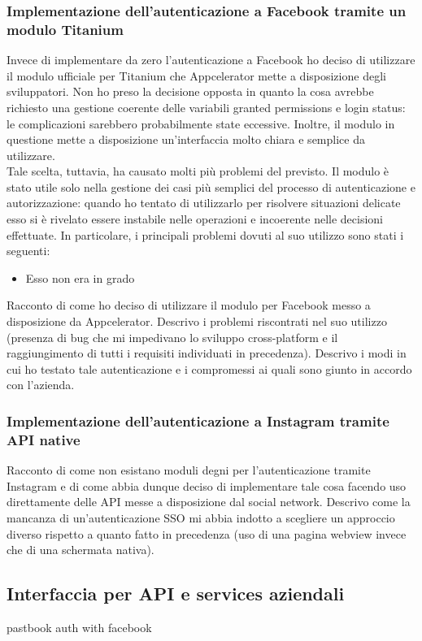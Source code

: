 			\subsubsection{Implementazione dell'autenticazione a Facebook tramite un modulo Titanium}
				Invece di implementare da zero l'autenticazione a Facebook ho deciso di utilizzare il modulo ufficiale per Titanium
				che Appcelerator mette a disposizione degli sviluppatori. Non ho preso la decisione opposta in quanto la cosa
				avrebbe richiesto una gestione coerente delle variabili granted permissions e login status: le complicazioni
				sarebbero probabilmente state eccessive. Inoltre, il modulo in questione mette a disposizione un'interfaccia
				molto chiara e semplice da utilizzare.\\
				Tale scelta, tuttavia, ha causato molti più problemi del previsto. Il modulo è stato utile solo nella gestione dei
				casi più semplici del processo di autenticazione e autorizzazione: quando ho tentato di utilizzarlo per risolvere
				situazioni delicate esso si è rivelato essere instabile nelle operazioni e incoerente nelle decisioni effettuate. In
				particolare, i principali problemi dovuti al suo utilizzo sono stati i seguenti:
				\begin{itemize}
					\item Esso non era in grado
				\end{itemize}
				Racconto di come ho deciso di utilizzare il modulo per Facebook messo a disposizione da Appcelerator. Descrivo i
				problemi riscontrati nel suo utilizzo (presenza di bug che mi impedivano lo sviluppo cross-platform e il
				raggiungimento di tutti i requisiti individuati in precedenza). Descrivo i modi in cui ho testato tale autenticazione
				e i compromessi ai quali sono giunto in accordo con l'azienda.
			\subsubsection{Implementazione dell'autenticazione a Instagram tramite API native}
				Racconto di come non esistano moduli degni per l'autenticazione tramite Instagram e di come abbia dunque deciso di
				implementare tale cosa facendo uso direttamente delle API messe a disposizione dal social network. Descrivo come la
				mancanza di un'autenticazione SSO mi abbia indotto a scegliere un approccio diverso rispetto a quanto fatto in
				precedenza (uso di una pagina webview invece che di una schermata nativa).
		\subsection{Interfaccia per API e services aziendali}
			pastbook auth with facebook
